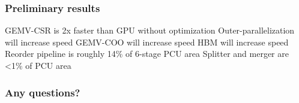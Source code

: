 \documentclass[aspectratio=169]{beamer}
\begin{document}
\begin{frame}
  \frametitle{Preliminary results}
  \begin{outline}
    \1 GEMV-CSR is 2x faster than GPU without optimization
    \2 Outer-parallelization will increase speed
    \2 GEMV-COO will increase speed
    \2 HBM will increase speed
    \1 Reorder pipeline is roughly 14\% of 6-stage PCU area
    \1 Splitter and merger are <1\% of PCU area
  \end{outline}
\end{frame}
\begin{frame}
  \frametitle{Any questions?}
\end{frame}
\end{document}
